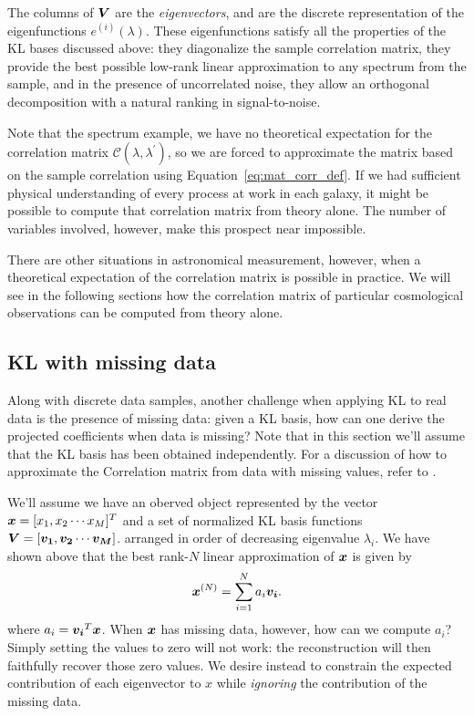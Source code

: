 The columns of $\boldsymbol{V}$ are the {\it eigenvectors}, and are the discrete
representation of the eigenfunctions $e^{(i)}(\lambda)$.  These eigenfunctions
satisfy all the properties of the KL bases discussed above: they diagonalize
the sample correlation matrix, they provide the best possible low-rank
linear approximation to any spectrum from the sample, and in the presence of
uncorrelated noise, they allow an orthogonal decomposition with a natural
ranking in signal-to-noise.

Note that the spectrum example, we have no theoretical expectation for the
correlation matrix $\mathcal{C}(\lambda, \lambda^\prime)$, so we are forced
to approximate the matrix based on the sample correlation using
Equation~\ref{eq:mat_corr_def}.  If we had sufficient physical understanding
of every process at work in each galaxy, it might be possible to compute
that correlation matrix from theory alone.  The number of variables involved,
however, make this prospect near impossible.

There are other situations in astronomical measurement, however, when a
theoretical expectation of the correlation matrix is possible in practice.
We will see in the following sections how the correlation matrix of
particular cosmological observations can be computed from theory alone.


\subsection{KL with missing data}
Along with discrete data samples, another challenge when applying KL to
real data is the presence of missing data: given a KL basis, how can
one derive the projected coefficients when data is missing?
Note that in this section we'll assume that the KL basis has been
obtained independently.  For a discussion of how to approximate the
Correlation matrix from data with missing values, refer to \citep{Yip04a}.

We'll assume we have an oberved object represented by the vector 
$\boldsymbol{x} = [x_1, x_2 \cdots x_M]^T$ and a set of normalized
KL basis functions 
$\boldsymbol{V} = [\boldsymbol{v_1}, \boldsymbol{v_2} \cdots \boldsymbol{v_M}]$.
arranged in order of decreasing eigenvalue $\lambda_i$.  We have shown above
that the best rank-$N$ linear approximation of $\boldsymbol{x}$ is given by
\begin{equation}
  \boldsymbol{x}^{(N)} = \sum_{i=1}^{N}a_i\boldsymbol{v_i}.
\end{equation}
where $a_i = \boldsymbol{v_i}^T\boldsymbol{x}$.  When $\boldsymbol{x}$ has missing data,
however, how can we compute $a_i$?  Simply setting the values to zero
will not work: the reconstruction will then faithfully recover those
zero values.  We desire instead to constrain the expected contribution
of each eigenvector to $x$ while {\it ignoring} the contribution of the
missing data.

